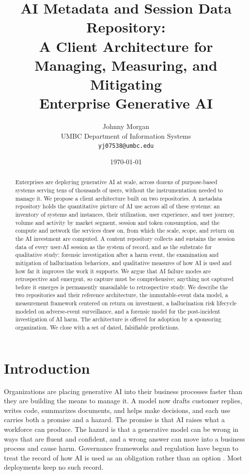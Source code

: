 \documentclass[11pt]{article}
\title{AI Metadata and Session Data Repository:\\
       A Client Architecture for Managing, Measuring, and Mitigating\\
       Enterprise Generative AI}
\author{Johnny Morgan \\ UMBC Department of Information Systems \\ \texttt{yj07538@umbc.edu}}
\date{\today}
\begin{document}
\maketitle

\begin{abstract}
Enterprises are deploying generative AI at scale, across dozens of purpose-based
systems serving tens of thousands of users, without the instrumentation needed to
manage it. We propose a client architecture built on two repositories. A metadata
repository holds the quantitative picture of AI use across all of these systems:
an inventory of systems and instances, their utilization, user experience, and
user journey, volume and activity by market segment, session and token
consumption, and the compute and network the services draw on, from which the
scale, scope, and return on the AI investment are computed. A content repository
collects and sustains the session data of every user-AI session as the system of
record, and as the substrate for qualitative study: forensic investigation after
a harm event, the examination and mitigation of hallucination behaviors, and
qualitative measures of how AI is used and how far it improves the work it
supports. We argue that AI
failure modes are retrospective and emergent, so capture must be comprehensive;
anything not captured before it emerges is permanently unavailable to
retrospective study. We describe the two repositories and their reference
architecture, the immutable-event data model, a measurement framework centered
on return on investment, a hallucination risk lifecycle modeled on adverse-event
surveillance, and a forensic model for the post-incident investigation of AI
harm. The architecture is offered for adoption by a sponsoring organization. We
close with a set of dated, falsifiable predictions.
\end{abstract}

\section{Introduction}

Organizations are placing generative AI into their business processes faster than
they are building the means to manage it. A model now drafts customer replies,
writes code, summarizes documents, and helps make decisions, and each use carries
both a promise and a hazard. The promise is that AI raises what a workforce can
produce. The hazard is that a generative model can be wrong in ways that are
fluent and confident, and a wrong answer can move into a business process and
cause harm. Governance frameworks and regulation have begun to treat the record of
how AI is used as an obligation rather than an option
\cite{nist2023airmf, euaiact2024}. Most deployments keep no such record.
\end{document}
